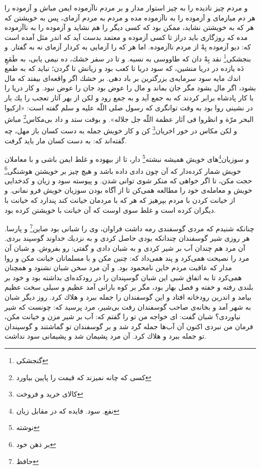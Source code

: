و مردم چيز ناديده را به چيز استوار مدار و بر مردم ناآزموده ايمن مباش و آزموده را هر دم ميازماى و آزموده را به ناآزموده مده و مردم به مردم‌ آزماى، پس به خويشتن كه هر كه به خويشتن نشايد، ممكن بود كه كسى ديگر را هم نشايد و آزموده را به نا‌آزموده مده كه روزگارى بايد دراز تا كسى آزموده و معتمد بدست آيد كه اندر مثل آمده است كه: ديو آزموده بِهْ از مردم ناآزموده. اما هر كه را آزمايى به كردار آزماى نه به گفتار. و     بنجشكى\footnote{گنجشکی} نقد بِهْ دان كه طاووسى به نسيه. و تا در سفر خشك، ده نيمى يابى، به طَمَعِ دَه يازده در دريا منشين، كه سود دريا تا كعب بود و زيانش تا گردن؛ نبايد كه به طمع اندك مايه سود سرمايه‌ی بزرگترين بر باد دهى. بر خشك اگر واقعه‌اى بيفتد كه مال بشود، اگر مال بشود مگر جان بماند و مال را عوض بود جان را عوض نبود. و كار دريا را با كار پادشاه برابر كردند كه به جمع آيد و به جمع رود و لكن از بهر آثار تعجب را يك بار در نشينى روا بود به وقت توانگرى كه رسول صلى اللّه عليه و سلم گفته است: «اركبوا البحر مرّة و انظروا فى آثار عظمة اللّه جل جلاله». و بوقت ستد و داد بى‌مكاس\footnote{کسی که چانه نمیزند که قیمت را پایین بیاورد}  مباش و لكن مكاس در خور اخريان\footnote{کالای خرید و فروخت}  كن و كار خويش جمله به دست كسان باز مهل، چه گفته‌اند كه: به دست كسان مار بايد گرفت.

و سوزيان‌\footnote{نفع. سود. فایده که در مقابل زیان}هاى خويش هميشه نبشته\footnote{نوشته}  دار، تا از بيهوده و غلط ايمن باشى و با معاملان خويش شمار كرده‌دار كه آن چون دادى داده باشد و هيچ چيز بر خويشتن هوشنگى\footnote{بر ذهن خود}  حجت مكن، تا اگر خواهى كه منكر شوى توانى شدن. و پيوسته سود و زيان و كدخدايى خويش و معامله‌ی خود را مطالعه همى‌كن تا از آگاه بودن سوزيان خويش فرو نمانى. و از خيانت كردن با مردم بپرهيز كه هر كه با مردمان خيانت كند پندارد كه خيانت با ديگران كرده است و غلط سوى اوست كه آن خيانت با خويشتن كرده بود.

چنانكه شنيدم كه مردى گوسفندى رمه داشت فراوان، وى را شبانى بود صاين\footnote{حافظ} و پارسا. هر روزى شير گوسفندان چندانكه بودى حاصل كردى و به نزديك خداوند گوسپند بردى. آن مرد هم چندان آب بر شير كردى و به شبان دادى و گفتى: رو بفروش. و شبان آن مرد را نصيحت همى‌كرد و پند همى‌داد كه: چنين مكن و با مسلمانان خيانت مكن و روا مدار كه عاقبت مردم خاين نامحمود بود. و آن مرد سخن شبان نشنود و همچنان همى‌كرد تا به‌     اتفاق شبى اين شبان گوسپندان را در رودكده‌اى بداشته بود و خود بر بلندى رفته و خفته و فصل بهار بود، مگر بر كوه بارانى آمد عظيم و سيلى سخت عظيم بيامد و اندرين رودخانه افتاد و اين گوسفندان را جمله ببرد و هلاك كرد. روز ديگر شبان به شهر آمد و بخانه‌ی صاحب گوسفندان رفت بى‌شير، مرد پرسيد كه: چونست كه شير نياوردى‌؟ شبان گفت: اى خواجه من تو را گفتم كه: آب بر شير مزن و خيانت مكن، فرمان من نبردى اكنون آن آب‌ها جمله گرد شد و بر گوسفندان تو گماشتند و گوسپندان تو جمله ببرد و هلاك كرد. آن مرد پشيمان شد و پشيمانى سود نداشت.

